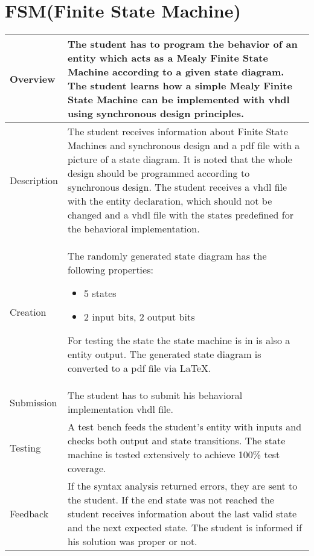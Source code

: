 \newpage

\section{FSM(Finite State Machine)}\label{finitestatemachine}
    \begin{tabular}{|p{2cm}|p{11cm}|}
        \hline
        Overview & The student has to program the behavior of an entity which acts as a Mealy Finite 
        State Machine according to a given state diagram. The student learns how a simple Mealy Finite
        State Machine can be implemented with vhdl using synchronous design principles.
        \\
        \hline
        Description & The student receives information about Finite State Machines and synchronous
        design and a pdf file with a picture of a state diagram. It is noted that the whole design should be 
        programmed according to synchronous design. The student receives a vhdl file with the 
        entity declaration, which should not be changed and a vhdl file with the states predefined 
        for the behavioral implementation.
        \\
        \hline
        Creation &  The randomly generated state diagram has the following properties:
        \begin{itemize}
            \item 5 states
            \item 2 input bits, 2 output bits
        \end{itemize}
        For testing the state the state machine is in is also a entity output. The generated state diagram 
        is converted to a pdf file via \LaTeX. 
        \\
        \hline
        Submission & The student has to submit his behavioral implementation vhdl file.
        \\
        \hline
        Testing & A test bench feeds the student's entity with inputs and checks both output and state
        transitions. The state machine is tested extensively to achieve 100\% test coverage. 
        \\
        \hline
        Feedback & If the syntax analysis returned errors, they are sent to the student. If the end 
        state was not reached the student receives information about the last valid state and the next 
        expected state. The student is informed if his solution was proper or not.
        \\
        \hline 
    \end{tabular}

